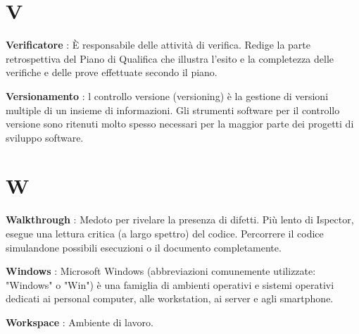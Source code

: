 \documentclass[12pt,a4paper,titlepage]{article}
\begin{document}
\section{V}
\begin{trivlist}
\item \textbf{Verificatore} : È responsabile delle attività di verifica. Redige la parte retrospettiva del Piano di Qualifica che illustra l'esito e la completezza delle verifiche e delle prove effettuate secondo il piano.
\item \textbf{Versionamento} : l controllo versione (versioning) è la gestione di versioni multiple di un insieme di informazioni. Gli strumenti software per il controllo versione sono ritenuti molto spesso necessari per la maggior parte dei progetti di sviluppo software.
\end{trivlist}

\section{W}
\begin{trivlist}
\item \textbf{Walkthrough} : Medoto per rivelare la presenza di difetti. Più lento di Ispector, esegue una lettura critica (a largo spettro) del codice. Percorrere il codice simulandone possibili esecuzioni o il documento completamente.
\item \textbf{Windows} : Microsoft Windows (abbreviazioni comunemente utilizzate: "Windows" o "Win") è una famiglia di ambienti operativi e sistemi operativi dedicati ai personal computer, alle workstation, ai server e agli smartphone.
\item \textbf{Workspace} : Ambiente di lavoro.
\end{trivlist}
\end{document}
